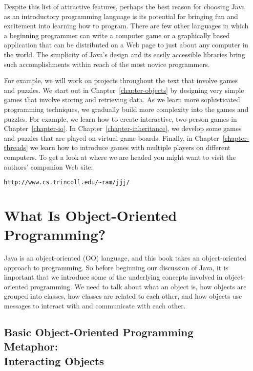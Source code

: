 \noindent Despite this list of attractive features, perhaps the best reason for
choosing Java as an introductory programming language is its potential
for bringing fun and excitement into learning how to program.  There
are few other languages in which a beginning programmer can write a
computer game or a graphically based application that can be
distributed on a Web page to just about any computer in the world.
The simplicity of Java's design and its easily accessible libraries
bring such accomplishments within reach of the most novice
programmers.

For example, we will work on projects throughout the text that involve
games and puzzles.  We start out in Chapter~\ref{chapter-objects} by designing very simple
games that involve storing and retrieving data.  As we learn more
sophisticated programming techniques, we gradually build more
complexity into the games and puzzles.  For example, we learn how to
create interactive, two-person games in Chapter~\ref{chapter-io}.  In Chapter~\ref{chapter-inheritance}, we
develop some games and puzzles that are played on virtual game boards.
Finally, in Chapter~\ref{chapter-threads} we learn how to introduce games with multiple
players on different computers. To get a look at where we are headed
you might want to visit the authors' companion Web site:

\WWWleft
\begin{jjjlisting}
\begin{lstlisting}[commentstyle=\color{black}\small]
http://www.cs.trincoll.edu/~ram/jjj/
\end{lstlisting}
\end{jjjlisting}

\section{What Is \mbox{Object-Oriented} Programming?}
\label{what-ismbox-programming}

\noindent Java is an object-oriented (OO) language, and this book
takes an object-oriented approach to programming.  So before beginning
our discussion of Java, it is important that we introduce some of the
underlying concepts involved in object-oriented programming.  We need
to talk about what an object is, how objects are grouped into classes,
how classes are related to each other, and how objects use messages to
interact with and communicate with each other.

\subsection{Basic \mbox{Object-Oriented} Programming Metaphor: 
\\Interacting Objects}

